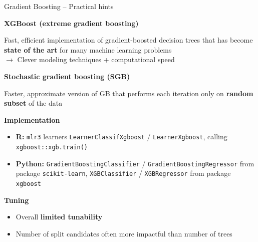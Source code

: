 \documentclass[11pt,compress,t,notes=noshow, xcolor=table]{beamer}
\newcommand{\highlight}[1]{\textcolor{highlightcol}{\textbf{#1}}}
\let\code=\texttt
\begin{document}
\begin{frame}{Gradient Boosting -- Practical hints}

\footnotesize

\highlight{XGBoost (extreme gradient boosting)} 

Fast, efficient implementation of gradient-boosted decision trees that has
become \textbf{state of the art} for many machine learning problems \\
$\rightarrow$ Clever modeling techniques + computational speed \\

\medskip

\highlight{Stochastic gradient boosting (SGB)}

Faster, approximate version of GB that performs each iteration only on 
\textbf{random subset} of the data \\

\medskip

\highlight{Implementation}

\begin{itemize}
  \item \textbf{R:} \code{mlr3} learners \code{LearnerClassifXgboost} / 
  \code{LearnerXgboost}, calling \code{xgboost::xgb.train()}
  \item \textbf{Python:} \code{GradientBoostingClassifier} / 
  \code{GradientBoostingRegressor} from package \code{scikit-learn}, 
  \code{XGBClassifier} / \code{XGBRegressor} from package \code{xgboost}
\end{itemize}

\medskip

\highlight{Tuning}
\begin{itemize}
  \item Overall \textbf{limited tunability}
  \item Number of split candidates often more impactful than number of trees
\end{itemize}

\end{frame}

\end{document}
